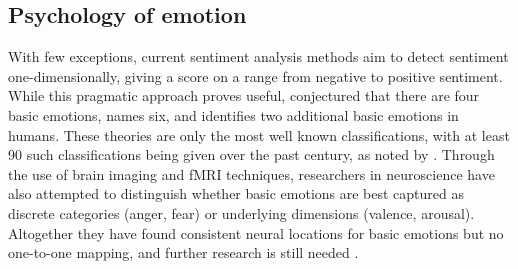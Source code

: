 \subsection{Psychology of emotion}
\label{subsec:psychology}

With few exceptions, current sentiment analysis methods aim to detect sentiment one-dimensionally, giving a score on a range from negative to positive sentiment.
While this pragmatic approach proves useful, \cite{jack2014dynamic} conjectured that there are four basic emotions, \cite{ekman1992argument} names six, and \cite{plutchik1991emotions} identifies two additional basic emotions in humans.
These theories are only the most well known classifications, with at least 90 such classifications being given over the past century, as noted by \cite{plutchik2001nature}.
Through the use of brain imaging and fMRI techniques, researchers in neuroscience have also attempted to distinguish whether basic emotions are best captured as discrete categories (anger, fear) or underlying dimensions (valence, arousal).
Altogether they have found consistent neural locations for basic emotions but no one-to-one mapping, and further research is still needed \citep{harrison2010embodiment,hamann2012mapping}.

